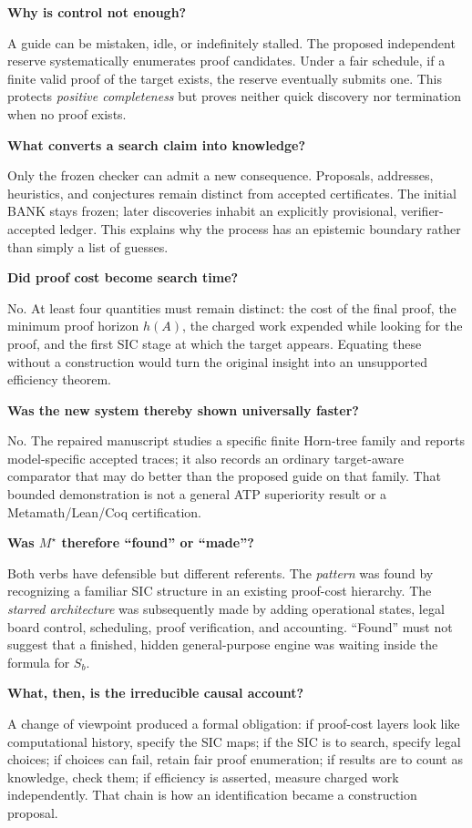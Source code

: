 \documentclass[11pt,letterpaper]{article}
\newcommand{\Ms}{M^{\star}}
\newcommand{\qline}[2]{\medskip\noindent{\color{accent}\textbf{Pass #1.}}\quad\textbf{#2}\par}
\begin{document}
\qline{6}{Why is control not enough?}
A guide can be mistaken, idle, or indefinitely stalled. The proposed independent reserve systematically enumerates proof candidates. Under a fair schedule, if a finite valid proof of the target exists, the reserve eventually submits one. This protects \emph{positive completeness} but proves neither quick discovery nor termination when no proof exists.

\qline{7}{What converts a search claim into knowledge?}
Only the frozen checker can admit a new consequence. Proposals, addresses, heuristics, and conjectures remain distinct from accepted certificates. The initial BANK stays frozen; later discoveries inhabit an explicitly provisional, verifier-accepted ledger. This explains why the process has an epistemic boundary rather than simply a list of guesses.

\qline{8}{Did proof cost become search time?}
No. At least four quantities must remain distinct: the cost of the final proof, the minimum proof horizon $h(A)$, the charged work expended while looking for the proof, and the first SIC stage at which the target appears. Equating these without a construction would turn the original insight into an unsupported efficiency theorem.

\qline{9}{Was the new system thereby shown universally faster?}
No. The repaired manuscript studies a specific finite Horn-tree family and reports model-specific accepted traces; it also records an ordinary target-aware comparator that may do better than the proposed guide on that family. That bounded demonstration is not a general ATP superiority result or a Metamath/Lean/Coq certification.

\qline{10}{Was $\Ms$ therefore ``found'' or ``made''?}
Both verbs have defensible but different referents. The \emph{pattern} was found by recognizing a familiar SIC structure in an existing proof-cost hierarchy. The \emph{starred architecture} was subsequently made by adding operational states, legal board control, scheduling, proof verification, and accounting. ``Found'' must not suggest that a finished, hidden general-purpose engine was waiting inside the formula for $S_b$.

\qline{11}{What, then, is the irreducible causal account?}
A change of viewpoint produced a formal obligation: if proof-cost layers look like computational history, specify the SIC maps; if the SIC is to search, specify legal choices; if choices can fail, retain fair proof enumeration; if results are to count as knowledge, check them; if efficiency is asserted, measure charged work independently. That chain is how an identification became a construction proposal.
\end{document}
